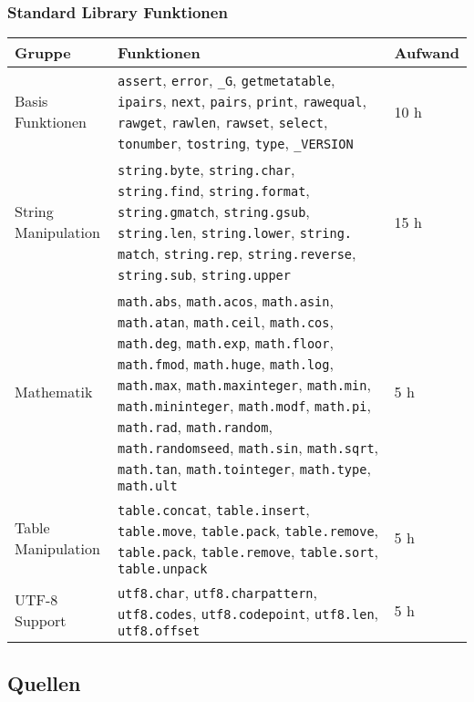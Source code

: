 \documentclass{article}
\begin{document}
\subsubsection*{Standard Library Funktionen}\hypertarget{standard-library-funktionen-1}{}\label{standard-library-funktionen-1}

\begin{longtabu} to \textwidth {|l|X[l]|l|}
\hline
\bfseries Gruppe & \bfseries Funktionen & \bfseries Aufwand\\
\hline
Basis Funktionen & \texttt{assert}, \texttt{error}, \texttt{\_G}, \texttt{getmetatable}, \texttt{ipairs}, \texttt{next}, \texttt{pairs}, \texttt{print}, \texttt{rawequal}, \texttt{rawget}, \texttt{rawlen}, \texttt{rawset}, \texttt{select}, \texttt{tonumber}, \texttt{tostring}, \texttt{type}, \texttt{\_VERSION} & 10 h\\
String Manipulation & \texttt{string.byte}, \texttt{string.char}, \texttt{string.find}, \texttt{string.format}, \texttt{string.gmatch}, \texttt{string.gsub}, \texttt{string.len}, \texttt{string.lower}, \texttt{string. match}, \texttt{string.rep}, \texttt{string.reverse}, \texttt{string.sub}, \texttt{string.upper} & 15 h\\
Mathematik & \texttt{math.abs}, \texttt{math.acos}, \texttt{math.asin}, \texttt{math.atan}, \texttt{math.ceil}, \texttt{math.cos}, \texttt{math.deg}, \texttt{math.exp}, \texttt{math.floor}, \texttt{math.fmod}, \texttt{math.huge}, \texttt{math.log}, \texttt{math.max}, \texttt{math.maxinteger}, \texttt{math.min}, \texttt{math.mininteger}, \texttt{math.modf}, \texttt{math.pi}, \texttt{math.rad}, \texttt{math.random}, \texttt{math.randomseed}, \texttt{math.sin}, \texttt{math.sqrt}, \texttt{math.tan}, \texttt{math.tointeger}, \texttt{math.type}, \texttt{math.ult} & 5 h\\
Table Manipulation & \texttt{table.concat}, \texttt{table.insert}, \texttt{table.move}, \texttt{table.pack}, \texttt{table.remove}, \texttt{table.pack}, \texttt{table.remove}, \texttt{table.sort}, \texttt{table.unpack} & 5 h\\
UTF-8 Support & \texttt{utf8.char}, \texttt{utf8.charpattern}, \texttt{utf8.codes}, \texttt{utf8.codepoint}, \texttt{utf8.len}, \texttt{utf8.offset} & 5 h\\
\hline
\end{longtabu}

\newpage
\subsection*{Quellen}\hypertarget{quellen}{}\label{quellen}
\end{document}
